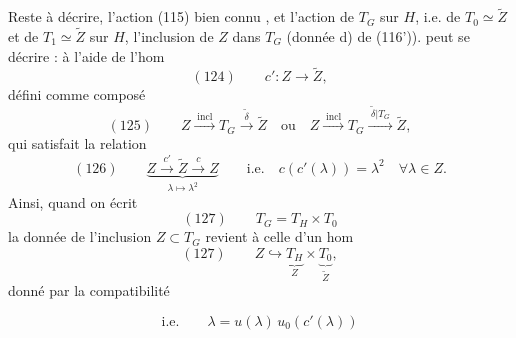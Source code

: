 \documentclass[11pt,a4paper]{article}
\begin{document}



Reste à décrire, \struck{\ill{}}  l'action \ill{} (115) bien connu
, et l'action de $T_G$ sur $H$, i.e. de $T_0\simeq\widetilde{Z}$ et de
$T_1\simeq\widetilde{Z}$ sur $H$, l'inclusion de $Z$ dans $T_G$ (donnée d) de (116')).
   peut se décrire : à l'aide de l'hom
\[
(124)\qquad c' : Z \longrightarrow \widetilde{Z} ,
\]
défini comme composé
\[
(125)\qquad Z \xrightarrow{\;\text{incl}\;} T_G \xrightarrow{\;\widetilde{\delta}\;}
\widetilde{Z} \quad\text{ou}\quad Z \xrightarrow{\;\text{incl}\;} T_G
\xrightarrow{\;\widetilde{\delta}\vert T_G\;} \widetilde{Z} ,
\]
qui satisfait la relation
\[
(126)\qquad
\underbrace{Z \xrightarrow{\;c'\;} \widetilde{Z} \xrightarrow{\;c\;} Z}_{\lambda\mapsto\lambda^2}
\qquad \text{i.e.}\quad c(c'(\lambda)) = \lambda^2 \quad \forall\lambda\in Z .
\]
Ainsi, quand on écrit
\[
(127)\qquad T_G = T_H\times T_0
\]
la donnée de l'inclusion $Z\subset T_G$ revient à celle d'un hom
\[
(127)\qquad Z \hookrightarrow \underbrace{T_H}_{Z}\times\underbrace{T_0}_{\widetilde{Z}} ,
\]
donné par la compatibilité




\[
\text{i.e.}\qquad \boxed{\lambda = u(\lambda)\,u_0(c'(\lambda))}
\]
\end{document}
